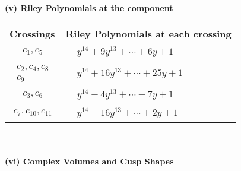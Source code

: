 \documentclass[1p]{elsarticle_modified}
\theoremstyle{definition}
\begin{document}
\newpage\renewcommand{\arraystretch}{1}
\flushleft \textbf{(v) Riley Polynomials at the component}\newline \\
\begin{tabular}{m{50pt}|m{274pt}}
Crossings & \hspace{64pt}Riley Polynomials at each crossing \\
\hline $$\begin{aligned}c_{1},c_{5}\end{aligned}$$&$\begin{aligned}
&y^{14}+9 y^{13}+\cdots+6 y+1
\end{aligned}$\\
\hline $$\begin{aligned}c_{2},c_{4},c_{8}\\c_{9}\end{aligned}$$&$\begin{aligned}
&y^{14}+16 y^{13}+\cdots+25 y+1
\end{aligned}$\\
\hline $$\begin{aligned}c_{3},c_{6}\end{aligned}$$&$\begin{aligned}
&y^{14}-4 y^{13}+\cdots-7 y+1
\end{aligned}$\\
\hline $$\begin{aligned}c_{7},c_{10},c_{11}\end{aligned}$$&$\begin{aligned}
&y^{14}-16 y^{13}+\cdots+2 y+1
\end{aligned}$\\
\hline
\end{tabular}\\~\\
\newpage\flushleft \textbf{(vi) Complex Volumes and Cusp Shapes}
\end{document}
